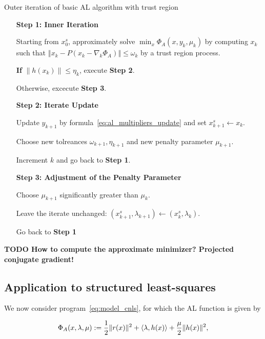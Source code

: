 \documentclass[10pt]{article}
\numberwithin{equation}{section}
\begin{document}
	 	\begin{algorithm}
	 	\caption{Outer iteration of basic AL algorithm with trust region}\label{algo:outer_basic_al_trm}
	 		\begin{enumerate}
	 		\item[\textbf{Step 1: Inner Iteration}]
	 		
	 		Starting from $x_0^s$, approximately solve $\min_x \Phi_A(x,y_k,\mu_k)$ by computing $x_k$ such that \(\left\Vert x_k - P(x_k-\nabla_k\Phi_A)\right\Vert \le \omega_k\)
	 		by a trust region process.
	 		
	 		\textbf{If} $\|h(x_k)\| \le \eta_k$, execute \textbf{Step 2}.
	 		
	 		Otherwise, excecute \textbf{Step 3}.
	 		
	 		\item[\textbf{Step 2: Iterate Update}]
	 		
	 		Update $y_{k+1}$ by formula~\eqref{eq:al_multipliers_update} and set $x_{k+1}^s \gets x_k $.
	 		
	 		Choose new tolreances \(\omega_{k+1}, \eta_{k+1}\) and new penalty parameter \(\mu_{k+1}\).
	 		
	 		Increment $k$ and go back to \textbf{Step 1}.
	 		
	 		\item[\textbf{Step 3: Adjustment of the Penalty Parameter}] 
	 		
	 		Choose $\mu_{k+1}$ significantly greater than $\mu_k$.
	 		
	 		Leave the iterate unchanged: \(\left(x_{k+1}^s,\lambda_{k+1}\right) \gets \left(x_k^s,\lambda_k\right)\).
	 		
	 		Go back to \textbf{Step 1}
	 	\end{enumerate}
	 \end{algorithm}
	 
	 \textbf{TODO How to compute the approximate minimizer? Projected conjugate gradient!}
	 \subsection{Application to structured least-squares}
	 
	 We now consider program~\eqref{eq:model_cnls}, for which the AL function is given by
	 
	 \begin{equation}
	 	\label{eq:lsal}
	 	\Phi_A(x,\lambda,\mu) := \dfrac{1}{2}\|r(x)\|^2 + \left\langle {\lambda} , {h(x)} \right\rangle + \dfrac{\mu}{2} \|h(x)\|^2,
	 \end{equation}
	 
\end{document}
